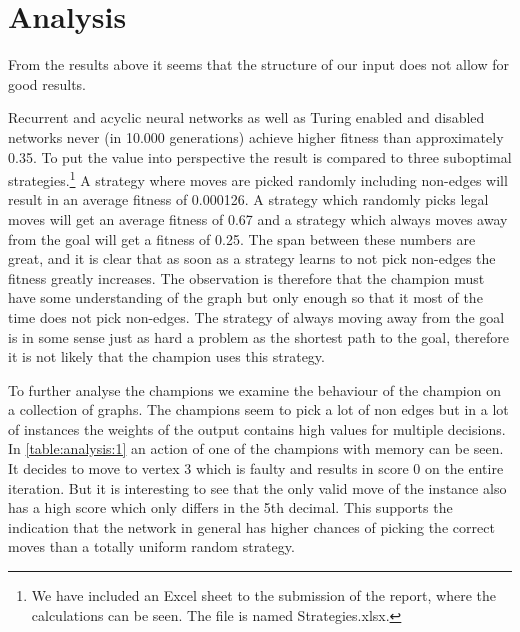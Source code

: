 
\section{Analysis}
From the results above it seems that the structure of our input does not allow for good results.

\newpar Recurrent and acyclic neural networks as well as Turing enabled and disabled networks never (in 10.000 generations) achieve higher fitness than approximately 0.35. To put the value into perspective the result is compared to three suboptimal strategies.\footnote{We have included an Excel sheet to the submission of the report, where the calculations can be seen. The file is named Strategies.xlsx.} A strategy where moves are picked randomly including non-edges will result in an average fitness of 0.000126. A strategy which randomly picks legal moves will get an average fitness of 0.67 and a strategy which always moves away from the goal will get a fitness of 0.25. The span between these numbers are great, and it is clear that as soon as a strategy learns to not pick non-edges the fitness greatly increases. The observation is therefore that the champion must have some understanding of the graph but only enough so that it most of the time does not pick non-edges. The strategy of always moving away from the goal is in some sense just as hard a problem as the shortest path to the goal, therefore it is not likely that the champion uses this strategy. 

To further analyse the champions we examine the behaviour of the champion on a collection of graphs. The champions seem to pick a lot of non edges but in a lot of instances the weights of the output contains high values for multiple decisions. In \autoref{table:analysis:1} an action of one of the champions with memory can be seen. It decides to move to vertex 3 which is faulty and results in score 0 on the entire iteration. But it is interesting to see that the only valid move of the instance also has a high score which only differs in the 5th decimal. This supports the indication that the network in general has higher chances of picking the correct moves than a totally uniform random strategy.

